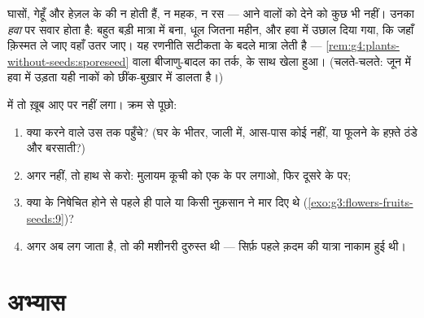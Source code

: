 \begin{example}[हवा से उड़ता पराग]\label{ex:g5:flower-to-fruit:wind}
घासों, गेहूँ और हेज़ल के  की न  होती हैं, न महक, न रस
--- आने वालों को देने को कुछ भी नहीं। उनका  \emph{हवा} पर सवार
होता है: बहुत बड़ी मात्रा में बना, धूल जितना महीन, और हवा में उछाल
दिया गया, कि जहाँ क़िस्मत ले जाए वहाँ उतर जाए। यह रणनीति सटीकता के
बदले मात्रा लेती है ---
\cref{rem:g4:plants-without-seeds:sporeseed} वाला बीजाणु-बादल का तर्क,
 के साथ खेला हुआ। (चलते-चलते: जून में हवा में उड़ता यही  नाकों
को छींक-बुख़ार में डालता है।)
\end{example}

\begin{method}[बिना फल वाले पौधे की जाँच]\label{met:g5:flower-to-fruit:diagnose}
 में  तो ख़ूब आए पर  नहीं लगा। क्रम से पूछो:
\begin{enumerate}
  \item क्या  करने वाले उस तक पहुँचे? (घर के भीतर, जाली में,
        आस-पास कोई  नहीं, या फूलने के हफ़्ते ठंडे और बरसाती?)
  \item अगर नहीं, तो हाथ से  करो: मुलायम कूची को एक  के
         पर लगाओ, फिर दूसरे  के  पर;
  \item क्या  के निषेचित होने से पहले ही पाले या किसी नुक़सान
        ने  मार दिए थे
        (\cref{exo:g3:flowers-fruits-seeds:9})?
  \item अगर अब  लग जाता है, तो  की मशीनरी दुरुस्त थी --- सिर्फ़
        पहले क़दम की यात्रा नाकाम हुई थी।
\end{enumerate}
\end{method}

\section{अभ्यास}

